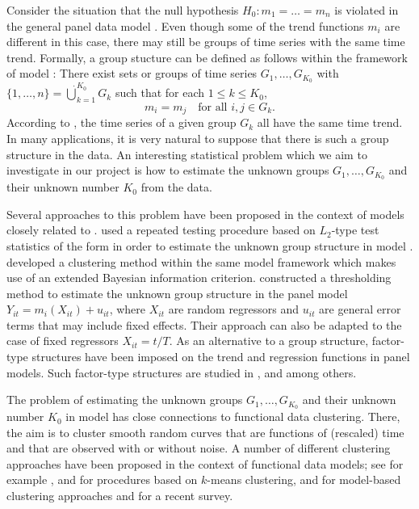 \documentclass[a4paper,12pt]{article}
\makeatletter
\renewcommand{\eqref}[1]{\tagform@{\ref{#1}}}
\makeatother
\begin{document}
\noindent Consider the situation that the null hypothesis $H_0: m_1 = \ldots = m_n$ is violated in the general panel data model \eqref{model}. Even though some of the trend functions $m_i$ are different in this case, there may still be groups of time series with the same time trend. Formally, a group stucture can be defined as follows within the framework of model \eqref{model}: There exist sets or groups of time series $G_1,\ldots,G_{K_0}$ with $\{1,\ldots,n\} = \dot\bigcup_{k=1}^{K_0} G_k$ such that for each $1 \le k \le K_0$, 
\begin{equation}\label{model-groups}
m_i = m_j \quad \text{for all } i,j \in G_k. 
\end{equation}
According to \eqref{model-groups}, the time series of a given group $G_k$ all have the same time trend. In many applications, it is very natural to suppose that there is such a group structure in the data. An interesting statistical problem which we aim to investigate in our project is how to estimate the unknown groups $G_1,\ldots,G_{K_0}$ and their unknown number $K_0$ from the data. 


Several approaches to this problem have been proposed in the context of models closely related to \eqref{model}. \cite{DegrasWu2012} used a repeated testing procedure based on $L_2$-type test statistics of the form \eqref{stat-degras} in order to estimate the unknown group structure in model \eqref{model-degras}. \cite{Zhang2013} developed a clustering method within the same model framework which makes use of an extended Bayesian information criterion. \cite{VogtLinton2017} constructed a thresholding method to estimate the unknown group structure in the panel model $Y_{it} = m_i(X_{it}) + u_{it}$, where $X_{it}$ are random regressors and $u_{it}$ are general error terms that may include fixed effects. Their approach can also be adapted to the case of fixed regressors $X_{it} = t/T$.  As an alternative to a group structure, factor-type structures have been imposed on the trend and regression functions in panel models. Such factor-type structures are studied in \cite{Kneip2012}, \cite{LintonVogt2015} and \cite{BonevaLintonVogt2016} among others. 


The problem of estimating the unknown groups $G_1,\ldots,G_{K_0}$ and their unknown number $K_0$ in model \eqref{model} has close connections to functional data clustering. There, the aim is to cluster smooth random curves that are functions of (rescaled) time and that are observed with or without noise. A number of different clustering approaches have been proposed in the context of functional data models; see for example \cite{Abraham2003}, \cite{Tarpey2003} and \cite{Tarpey2007} for procedures based on $k$-means clustering, \cite{James2003} and \cite{Chiou2007} for model-based clustering approaches and \cite{Jacques2014} for a recent survey. 
\end{document}
